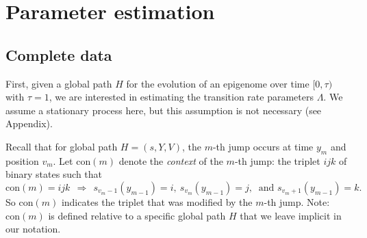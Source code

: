 \documentclass[11pt]{article}
\newcommand{\context}[1]{\ensuremath{\mathrm{con}(#1)}}
\newcommand\halfopen[2]{\ensuremath{[#1,#2)}}
\begin{document}

\section{Parameter estimation}

\subsection{Complete data}

First, given a global path $H$ for the evolution of an epigenome over
time $\halfopen{0}{\tau}$ with $\tau = 1$, we are interested in
estimating the transition rate parameters $\Lambda$.
We assume a stationary process here, but this assumption is not
necessary (see Appendix).

Recall that for global path $H = (s, Y, V)$, the $m$-th jump occurs at
time $y_m$ and position $v_m$. Let $\context{m}$ denote the
\textit{context} of the $m$-th jump: the triplet $ijk$ of binary
states such that
\[
\context{m} = ijk ~~ \Rightarrow ~~ s_{v_m-1}(y_{m-1}) = i, ~ s_{v_m}(y_{m-1}) = j, ~ \mbox{ and } s_{v_m+1}(y_{m-1}) = k.
\]
So $\context{m}$ indicates the triplet that was modified by the $m$-th
jump. Note: $\context{m}$ is defined relative to a specific global
path $H$ that we leave implicit in our notation.
\end{document}
